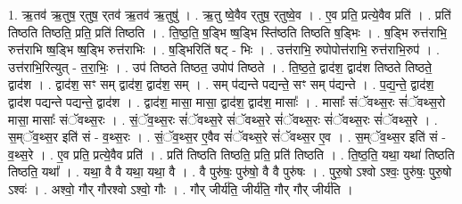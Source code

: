\documentclass[17pt]{extarticle}
\begin{document}
1. ऋ॒तव॑ ऋ॒तुष॒ र्‌तुष॒ र्‌तव॑ ऋ॒तव॑ ऋ॒तुषु॑ । . ऋ॒तु ष्वे॒वैव र्‌तुष॒ र्‌तुष्वे॒व । . ए॒व प्रति॒ प्रत्ये॒वैव प्रति॑ । . प्रति॑ तिष्ठति तिष्ठति॒ प्रति॒ प्रति॑ तिष्ठति । . ति॒ष्ठ॒ति॒ ष॒ड्भि ष्ष॒ड्भि स्ति॑ष्ठति तिष्ठति ष॒ड्भिः । . ष॒ड्भि रुत्त॑राभि॒ रुत्त॑राभि ष्ष॒ड्भि ष्ष॒ड्भि रुत्त॑राभिः । . ष॒ड्भिरिति॑ षट् - भिः । . उत्त॑राभि॒ रुपोपोत्त॑राभि॒ रुत्त॑राभि॒रुप॑ । . उत्त॑राभि॒रित्युत् - त॒रा॒भिः॒ । . उप॑ तिष्ठते तिष्ठत॒ उपोप॑ तिष्ठते । . ति॒ष्ठ॒ते॒ द्वाद॑श॒ द्वाद॑श तिष्ठते तिष्ठते॒ द्वाद॑श । . द्वाद॑श॒ सꣳ सम् द्वाद॑श॒ द्वाद॑श॒ सम् । . सम् प॑द्यन्ते पद्यन्ते॒ सꣳ सम् प॑द्यन्ते । . प॒द्य॒न्ते॒ द्वाद॑श॒ द्वाद॑श पद्यन्ते पद्यन्ते॒ द्वाद॑श । . द्वाद॑श॒ मासा॒ मासा॒ द्वाद॑श॒ द्वाद॑श॒ मासाः᳚ । . मासाः᳚ संॅवथ्स॒रः सं॑ॅवथ्स॒रो मासा॒ मासाः᳚ संॅवथ्स॒रः । . सं॒ॅव॒थ्स॒रः सं॑ॅवथ्स॒रे सं॑ॅवथ्स॒रे सं॑ॅवथ्स॒रः सं॑ॅवथ्स॒रः सं॑ॅवथ्स॒रे । . स॒म्ॅव॒थ्स॒र इति॑ सं - व॒थ्स॒रः । . सं॒ॅव॒थ्स॒र ए॒वैव सं॑ॅवथ्स॒रे सं॑ॅवथ्स॒र ए॒व । . स॒म्ॅव॒थ्स॒र इति॑ सं - व॒थ्स॒रे । . ए॒व प्रति॒ प्रत्ये॒वैव प्रति॑ । . प्रति॑ तिष्ठति तिष्ठति॒ प्रति॒ प्रति॑ तिष्ठति । . ति॒ष्ठ॒ति॒ यथा॒ यथा॑ तिष्ठति तिष्ठति॒ यथा᳚ । . यथा॒ वै वै यथा॒ यथा॒ वै । . वै पुरु॑षः॒ पुरु॑षो॒ वै वै पुरु॑षः । . पुरु॒षो ऽश्वो ऽश्वः॒ पुरु॑षः॒ पुरु॒षो ऽश्वः॑ । . अश्वो॒ गौर् गौरश्वो ऽश्वो॒ गौः । . गौर् जीर्य॑ति॒ जीर्य॑ति॒ गौर् गौर् जीर्य॑ति । \newline
\end{document}
